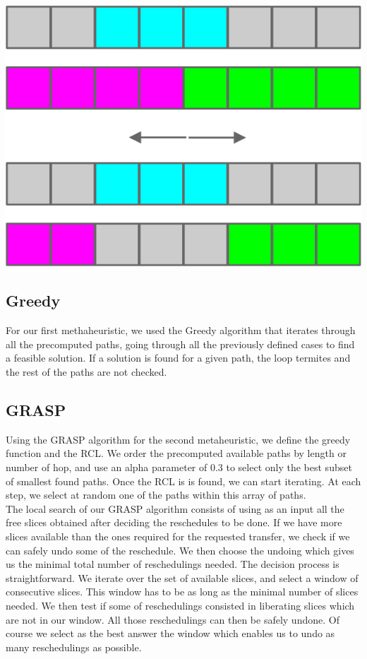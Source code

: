 \documentclass[11pt,a4paper]{article}
\begin{document}
\includegraphics[scale=1]{hardcase.jpg}

 \subsection{Greedy}
For our first methaheuristic, we used the Greedy algorithm that iterates through all the precomputed paths, going through all the previously defined cases to find a feasible solution. If a solution is found for a given path, the loop termites and the rest of the paths are not checked.
 
 \subsection{GRASP}
Using the GRASP algorithm for the second metaheuristic, we define the greedy function and the RCL. We order the precomputed available paths by length or number of hop, and use an alpha parameter of 0.3 to select only the best subset of smallest found paths. Once the RCL is is found, we can start iterating. At each step, we select at random one of the paths within this array of paths.\\

The local search of our GRASP algorithm consists of using as an input all the free slices obtained after deciding the reschedules to be done. If we have more slices available than the ones required for the requested transfer, we check if we can safely undo some of the reschedule. We then choose the undoing which gives us the minimal total number of reschedulings needed. The decision process is straightforward. We iterate over the set of available slices, and select a window of consecutive slices. This window has to be as long as the minimal number of slices needed. We then test if some of reschedulings consisted in liberating slices which are not in our window. All those reschedulings can then be safely undone. Of course we select as the best answer the window which enables us to undo as many reschedulings as possible. 
\end{document}
